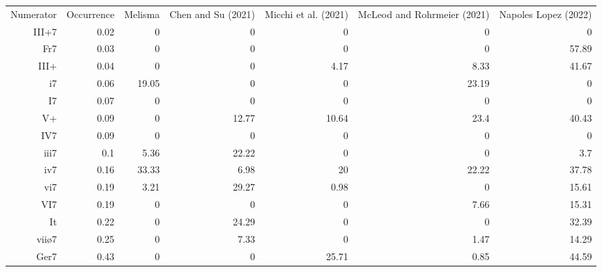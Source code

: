 \begin{tabular}{rrrrrrr}
Numerator & Occurrence & Melisma & Chen and Su (2021) & Micchi et al. (2021) & McLeod and Rohrmeier (2021) & Napoles Lopez (2022) \\
III+7     & 0.02       & 0       & 0                  & 0                    & 0                           & 0                    \\
Fr7       & 0.03       & 0       & 0                  & 0                    & 0                           & 57.89                \\
III+      & 0.04       & 0       & 0                  & 4.17                 & 8.33                        & 41.67                \\
i7        & 0.06       & 19.05   & 0                  & 0                    & 23.19                       & 0                    \\
I7        & 0.07       & 0       & 0                  & 0                    & 0                           & 0                    \\
V+        & 0.09       & 0       & 12.77              & 10.64                & 23.4                        & 40.43                \\
IV7       & 0.09       & 0       & 0                  & 0                    & 0                           & 0                    \\
iii7      & 0.1        & 5.36    & 22.22              & 0                    & 0                           & 3.7                  \\
iv7       & 0.16       & 33.33   & 6.98               & 20                   & 22.22                       & 37.78                \\
vi7       & 0.19       & 3.21    & 29.27              & 0.98                 & 0                           & 15.61                \\
VI7       & 0.19       & 0       & 0                  & 0                    & 7.66                        & 15.31                \\
It        & 0.22       & 0       & 24.29              & 0                    & 0                           & 32.39                \\
viiø7     & 0.25       & 0       & 7.33               & 0                    & 1.47                        & 14.29                \\
Ger7      & 0.43       & 0       & 0                  & 25.71                & 0.85                        & 44.59                \\

\end{tabular}
